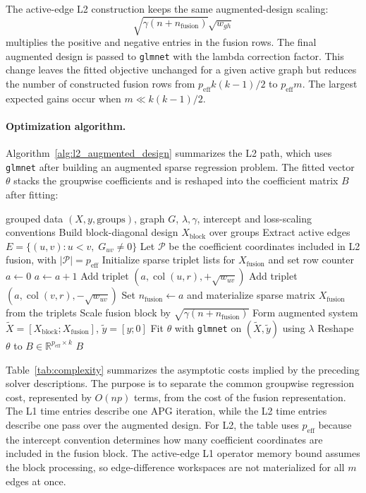 \documentclass[twoside,11pt]{article}
\newcommand{\R}{\mathbb{R}}
\begin{document}
The active-edge L2 construction keeps the same augmented-design scaling:
\[
  \sqrt{\gamma(n+n_{\mathrm{fusion}})}\sqrt{w_{gh}}
\]
multiplies the positive and negative entries in the fusion rows. 
The final augmented design is passed to \texttt{glmnet} \citep{glmnet} with the lambda correction factor.
This change leaves the fitted objective unchanged for a given active graph but reduces the number of constructed fusion rows from $p_{\mathrm{eff}} k(k-1)/2$ to $p_{\mathrm{eff}}m$. 
The largest expected gains occur when $m \ll k(k-1)/2$.

\paragraph{Optimization algorithm.}
Algorithm~\ref{alg:l2_augmented_design} summarizes the L2 path, which uses \texttt{glmnet} \citep{glmnet} after building an augmented sparse regression problem.
The fitted vector $\theta$ stacks the groupwise coefficients and is reshaped into the coefficient matrix $B$ after fitting:
\begin{algorithm}[t]
\caption{L2 Augmented Design Solver with \texttt{glmnet}}
\label{alg:l2_augmented_design}
\begin{algorithmic}[1]
\Require grouped data $(X,y,\mathrm{groups})$, graph $G$, $\lambda,\gamma$, intercept and loss-scaling conventions
\State Build block-diagonal design $X_{\mathrm{block}}$ over groups
\State Extract active edges $E=\{(u,v):u<v,\;G_{uv}\ne 0\}$
\State Let $\mathcal P$ be the coefficient coordinates included in L2 fusion, with $|\mathcal P|=p_{\mathrm{eff}}$
\State Initialize sparse triplet lists for $X_{\mathrm{fusion}}$ and set row counter $a\gets 0$
    \State $a\gets a+1$
    \State Add triplet $(a,\operatorname{col}(u,r),+\sqrt{w_{uv}})$
    \State Add triplet $(a,\operatorname{col}(v,r),-\sqrt{w_{uv}})$
  \EndFor
\EndFor
\State Set $n_{\mathrm{fusion}}\gets a$ and materialize sparse matrix
$X_{\mathrm{fusion}}$ from the triplets
\State Scale fusion block by $\sqrt{\gamma(n+n_{\mathrm{fusion}})}$
\State Form augmented system $\tilde X=[X_{\mathrm{block}};X_{\mathrm{fusion}}]$, $\tilde y=[y;0]$
\State Fit $\theta$ with \texttt{glmnet} on $(\tilde X,\tilde y)$ using $\lambda$
\State Reshape $\theta$ to $B\in\R^{p_{\mathrm{eff}}\times k}$
\State \Return $B$
\end{algorithmic}
\end{algorithm}

Table~\ref{tab:complexity} summarizes the asymptotic costs implied by the preceding solver descriptions. 
The purpose is to separate the common groupwise regression cost, represented by $O(np)$ terms, from the cost of the fusion representation. 
The L1 time entries describe one APG iteration, while the L2 time entries describe one pass over the augmented design. 
For L2, the table uses $p_{\mathrm{eff}}$ because the intercept convention determines how many coefficient coordinates are included in the fusion block. 
The active-edge L1 operator memory bound assumes the block processing, so edge-difference workspaces are not materialized for all $m$ edges at once.
\end{document}
